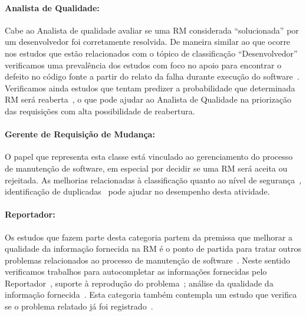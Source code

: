 \paragraph{Analista de Qualidade:}

Cabe ao Analista de qualidade avaliar se uma RM considerada ``solucionada'' por
um desenvolvedor foi corretamente resolvida. De maneira similar ao que ocorre
nos estudos que estão relacionados com o tópico de classificação
``Desenvolvedor'' verificamos uma prevalência dos estudos com foco no apoio para
encontrar o defeito no código fonte a partir do relato da falha durante execução
do software~\cite{corley2011recovering,Wong:2014:BBF:2705615.2706096,
    Thung:2014:BIT:2635868.2661678,Nguyen:2012:MAR:2393596.2393671,thung2013automatic,
    Romo:2015:TAT:2745802.2745833}. Verificamos ainda estudos que tentam
predizer a probabilidade que determinada RM será
reaberta~\cite{xia2015automatic}, o que pode ajudar ao Analista de Qualidade na
priorização das requisições com alta possibilidade de reabertura.

\paragraph{Gerente de Requisição de	Mudança:}

O papel que representa esta classe está vinculado ao gerenciamento do processo
de manutenção de software, em especial por decidir se uma RM será aceita ou
rejeitada. As melhorias relacionadas à classificação quanto ao
nível de segurança~\cite{gegick2010identifying, zhang2011bug,
    ValdiviaGarcia:2014:CPB:2597073.2597099}, identificação de
duplicadas~\cite{hindle2016contextual, sun2010discriminative,
    alipour2013contextual, banerjee2012automated} pode ajudar no desempenho
desta atividade.

\paragraph{Reportador:}

Os estudos que fazem parte desta categoria  partem da premissa que melhorar a
qualidade da informação fornecida na RM é o ponto de partida para tratar outros
problemas relacionados ao processo de manutenção de
software~\cite{moran2015auto, Moran:2015:EAA:2786805.2807557,
    zimmermann2010makes}. Neste sentido verificamos trabalhos para
autocompletar as informações fornecidas pelo Reportador~\cite{moran2015auto},
suporte à reprodução do problema~\cite{Moran:2015:EAA:2786805.2807557}; análise
da qualidade da informação fornecida~\cite{zimmermann2010makes,
    Tu:2014:MQI:2677832.2677844}.  Esta categoria também contempla um estudo
que verifica se o problema relatado já foi registrado~\cite{Thung2014}.

